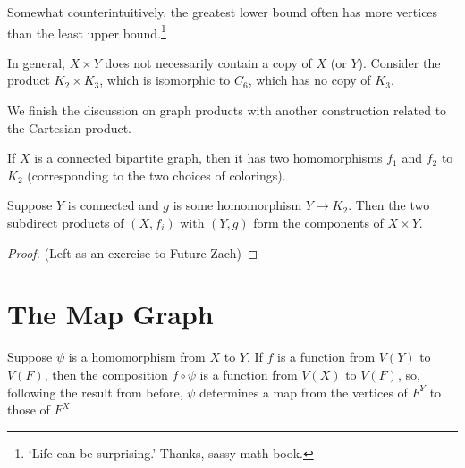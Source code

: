 Somewhat counterintuitively, the greatest lower bound often has more vertices than the least upper bound.\footnote{`Life can be surprising.' Thanks, sassy math book.}


In general, $X\times Y$ does not necessarily contain a copy of $X$ (or $Y$).  Consider the product $K_2\times K_3$, which is isomorphic to $C_6$, which has no copy of $K_3$.

We finish the discussion on graph products with another construction related to the Cartesian product.


If $X$ is a connected bipartite graph, then it has two homomorphisms $f_1$ and $f_2$ to $K_2$ (corresponding to the two choices of colorings).  

\begin{claim}
	
Suppose $Y$ is connected and $g$ is some homomorphism $Y\rightarrow K_2$.  Then the two subdirect products of $(X,f_i)$ with $(Y,g)$ form the components of $X\times Y$.
\end{claim}
\begin{proof}
	(Left as an exercise to Future Zach)
\end{proof}

\section*{The Map Graph}

Suppose $\psi$ is a homomorphism from $X$ to $Y$.   If $f$ is a function from $V(Y)$ to $V(F)$, then the composition $f\circ \psi$ is a function from $V(X)$ to $V(F)$, so, following the result from before, $\psi$ determines a map from the vertices of $F^Y$ to those of $F^X$.

